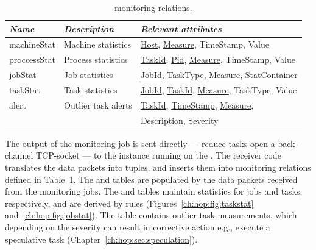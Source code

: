 \begin{table}
\ssp
\centering
\begin{tabular}{|l|l|l|} \hline
\textit{Name}    & \textit{Description} & \textit{Relevant attributes} \\ \hline\hline
machineStat    & Machine statistics   & \underline{Host}, \underline{Measure}, TimeStamp, Value \\ \hline
proccessStat   & Process statistics    & \underline{TaskId}, \underline{Pid}, \underline{Measure}, TimeStamp, Value \\ \hline
jobStat              & Job statistics            & \underline{JobId}, \underline{TaskType}, \underline{Measure}, StatContainer \\ \hline
taskStat            & Task statistics          & \underline{JobId}, \underline{TaskId}, \underline{Measure}, TaskType, Value \\ \hline
alert                   & Outlier task alerts   & \underline{TaskId}, \underline{TimeStamp}, \underline{Measure}, \\
                           &                                   & Description, Severity \\ \hline
\end{tabular}
\caption{\JOL monitoring relations.}
\label{ch:hop:tbl:monitorCatalog}
\end{table}

The output of the monitoring job is sent directly --- reduce tasks open a
back-channel TCP-socket --- to the \JOL instance running on the \JT.  The
receiver code translates the data packets into \JOL tuples, and inserts them
into monitoring relations defined in Table~\ref{ch:hop:tbl:monitorCatalog}.
The  and  tables are populated by the data
packets received from the monitoring jobs.  The  and 
tables maintain statistics for jobs and tasks, respectively, and are derived by
\OVERLOG rules (Figures~\ref{ch:hop:fig:taskstat}
and~\ref{ch:hop:fig:jobstat}).  The  table contains outlier task
measurements, which depending on the severity can result in corrective action
e.g., execute a speculative task (Chapter~\ref{ch:hop:sec:speculation}).

